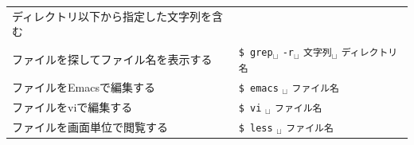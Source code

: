 \documentclass{jarticle}
\begin{document}
\begin{table}[htbp]
\begin{center}
\begin{tabular}{ll}
      ディレクトリ以下から指定した文字列を含む\\
      ファイルを探してファイル名を表示する &
	 \verb|$ grep|$_\sqcup$ \verb|-r|$_\sqcup$ \verb|文字列|$_\sqcup$ \verb|ディレクトリ名| \\ \midrule
      ファイルをEmacsで編集する&
	  \verb|$ emacs| $_\sqcup$ \verb|ファイル名 | \\ \midrule
      ファイルをviで編集する&
	  \verb|$ vi| $_\sqcup$ \verb|ファイル名 | \\ \midrule
      ファイルを画面単位で閲覧する&
	  \verb|$ less| $_\sqcup$ \verb|ファイル名 | \\ \midrule

     \end{tabular}
  \end{center}
\end{table}


	  
\end{document}
